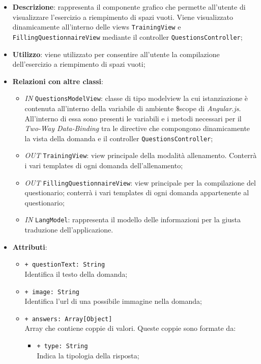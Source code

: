 		\begin{itemize}
			\item \textbf{Descrizione}: rappresenta il componente grafico che permette all'utente di visualizzare l'esercizio a riempimento di spazi vuoti. Viene visualizzato dinamicamente all'interno delle views \texttt{TrainingView} e \texttt{FillingQuestionnaireView} mediante il controller \texttt{QuestionsController};
			\item \textbf{Utilizzo}: viene utilizzato per consentire all'utente la compilazione dell'esercizio a riempimento di spazi vuoti;
			\item \textbf{Relazioni con altre classi}: 
			\begin{itemize}
				\item \textit{IN} \texttt{QuestionsModelView}: classe di tipo modelview la cui istanziazione è contenuta all'interno della variabile di ambiente \$scope di \textit{Angular.js}. All'interno di essa sono presenti le variabili e i metodi necessari per il \textit{Two-Way Data-Binding} tra le directive che compongono dinamicamente la vista della domanda e il controller \texttt{QuestionsController};
				\item \textit{OUT} \texttt{TrainingView}: view principale della modalità allenamento. Conterrà i vari templates di ogni domanda dell'allenamento;
				\item \textit{OUT} \texttt{FillingQuestionnaireView}: view principale per la compilazione del questionario; conterrà i vari templates di ogni domanda appartenente al questionario;   
				\item \textit{IN} \texttt{LangModel}: rappresenta il modello delle informazioni per la giusta traduzione dell'applicazione.
			\end{itemize}
			\item \textbf{Attributi}: 
			\begin{itemize}
				\item \texttt{+ questionText: String} \\ Identifica il testo della domanda;
				\item \texttt{+ image: String} \\ Identifica l'url di una possibile immagine nella domanda;
				\item \texttt{+ answers: Array[Object]} \\ Array che contiene coppie di valori. Queste coppie sono formate da:
				\begin{itemize}
					\item \texttt{+ type: String} \\ Indica la tipologia della risposta;

\end{itemize}
\end{itemize}
\end{itemize}
